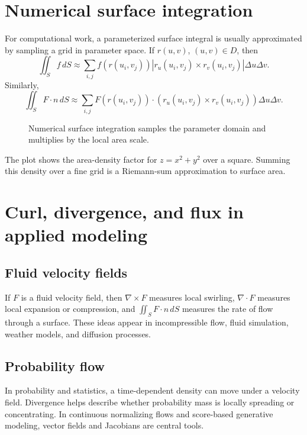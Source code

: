 \documentclass[11pt]{article}
\newcommand{\grad}{\nabla}
\newcommand{\dS}{\,dS}
\begin{document}
\section{Numerical surface integration}

For computational work, a parameterized surface integral is usually approximated by sampling a grid in parameter space. If $r(u,v)$, $(u,v)\in D$, then
\[
\iint_S f\dS\approx \sum_{i,j} f(r(u_i,v_j))|r_u(u_i,v_j)\times r_v(u_i,v_j)|\Delta u\Delta v.
\]
Similarly,
\[
\iint_S F\cdot n\dS\approx \sum_{i,j} F(r(u_i,v_j))\cdot(r_u(u_i,v_j)\times r_v(u_i,v_j))\Delta u\Delta v.
\]

\begin{figure}[H]
\centering
{}
\caption{Numerical surface integration samples the parameter domain and multiplies by the local area scale.}
\end{figure}

The plot shows the area-density factor for $z=x^2+y^2$ over a square. Summing this density over a fine grid is a Riemann-sum approximation to surface area.

\section{Curl, divergence, and flux in applied modeling}

\subsection*{Fluid velocity fields}
If $F$ is a fluid velocity field, then $\grad\times F$ measures local swirling, $\grad\cdot F$ measures local expansion or compression, and $\iint_S F\cdot n\dS$ measures the rate of flow through a surface. These ideas appear in incompressible flow, fluid simulation, weather models, and diffusion processes.

\subsection*{Probability flow}
In probability and statistics, a time-dependent density can move under a velocity field. Divergence helps describe whether probability mass is locally spreading or concentrating. In continuous normalizing flows and score-based generative modeling, vector fields and Jacobians are central tools.
\end{document}
